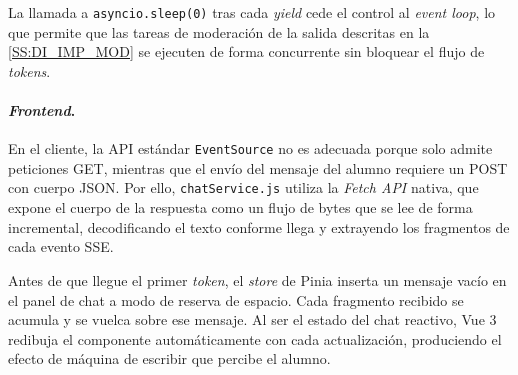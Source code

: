 La llamada a \texttt{asyncio.sleep(0)} tras cada \textit{yield} cede el control al \textit{event loop}, lo que permite que las tareas de moderación de la salida descritas en la \autoref{SS:DI_IMP_MOD} se ejecuten de forma concurrente sin bloquear el flujo de \textit{tokens}.

\paragraph{\textit{Frontend}.}

En el cliente, la API estándar \texttt{EventSource} no es adecuada porque solo admite peticiones GET, mientras que el envío del mensaje del alumno requiere un POST con cuerpo JSON. Por ello, \texttt{chatService.js} utiliza la \textit{Fetch API} nativa, que expone el cuerpo de la respuesta como un flujo de bytes que se lee de forma incremental, decodificando el texto conforme llega y extrayendo los fragmentos de cada evento SSE.

Antes de que llegue el primer \textit{token}, el \textit{store} de Pinia inserta un mensaje vacío en el panel de chat a modo de reserva de espacio. Cada fragmento recibido se acumula y se vuelca sobre ese mensaje. Al ser el estado del chat reactivo, Vue 3 redibuja el componente automáticamente con cada actualización, produciendo el efecto de máquina de escribir que percibe el alumno.
